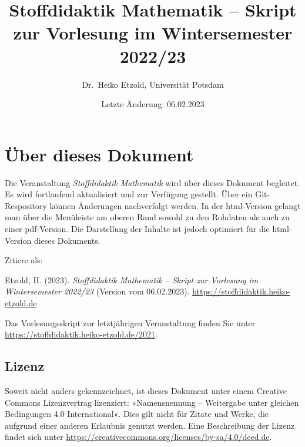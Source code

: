 \documentclass[
]{scrbook}
\title{Stoffdidaktik Mathematik -- Skript zur Vorlesung im Wintersemester 2022/23}
\author{Dr.~Heiko Etzold, Universität Potsdam}
\date{Letzte Änderung: 06.02.2023}
\makeatletter
\renewenvironment{quote}{
  \list{}{
	\leftmargin0.2cm   %
    \rightmargin\leftmargin
      	\def\FrameCommand
    {%
        {\color{quoteColor}\vrule width 2pt}%
        \hspace{0pt}%
    }%
    \MakeFramed{\advance \hsize -\width \FrameRestore}    \color{quoteColor}
    }
  \item\relax
}
{\endlist\color{black}\endMakeFramed}
\def\renewtheorem#1{%
  \expandafter\let\csname#1\endcsname\relax
  \expandafter\let\csname c@#1\endcsname\relax
  \gdef\renewtheorem@envname{#1}
  \renewtheorem@secpar
}
\def\renewtheorem@secpar{\@ifnextchar[{\renewtheorem@numberedlike}{\renewtheorem@nonumberedlike}}
\def\renewtheorem@numberedlike[#1]#2{\newtheorem{\renewtheorem@envname}[#1]{#2}}
\def\renewtheorem@nonumberedlike#1{
\def\renewtheorem@caption{#1}
\edef\renewtheorem@nowithin{\noexpand\newtheorem{\renewtheorem@envname}{\renewtheorem@caption}}
\renewtheorem@thirdpar
}
\def\renewtheorem@thirdpar{\@ifnextchar[{\renewtheorem@within}{\renewtheorem@nowithin}}
\def\renewtheorem@within[#1]{\renewtheorem@nowithin[#1]}
\theoremstyle{definition}
\theoremstyle{definition}
\theoremstyle{definition}
\theoremstyle{definition}
\theoremstyle{remark}
\makeatother
\begin{document}
\maketitle

%

{
\hypersetup{linkcolor=}
\setcounter{tocdepth}{1}
\tableofcontents
}
\hypertarget{uxfcber-dieses-dokument}{%
\chapter*{Über dieses Dokument}\label{uxfcber-dieses-dokument}}

Die Veranstaltung \emph{Stoffdidaktik Mathematik} wird über dieses Dokument begleitet. Es wird fortlaufend aktualisiert und zur Verfügung gestellt. Über ein Git-Respository können Änderungen nachverfolgt werden. In der html-Version gelangt man über die Menüleiste am oberen Rand sowohl zu den Rohdaten als auch zu einer pdf-Version. Die Darstellung der Inhalte ist jedoch optimiert für die html-Version dieses Dokuments.

Zitiere als:

\begin{quote}
Etzold, H. (2023). \emph{Stoffdidaktik Mathematik -- Skript zur Vorlesung im Wintersemester 2022/23} (Version vom 06.02.2023). \url{https://stoffdidaktik.heiko-etzold.de}
\end{quote}

Das Vorlesungsskript zur letztjährigen Veranstaltung finden Sie unter \url{https://stoffdidaktik.heiko-etzold.de/2021}.

\hypertarget{lizenz}{%
\section*{Lizenz}\label{lizenz}}

Soweit nicht anders gekennzeichnet, ist dieses Dokument unter einem Creative Commons Lizenzvertrag lizenziert: »Namensnennung -- Weitergabe unter gleichen Bedingungen 4.0 International«. Dies gilt nicht für Zitate und Werke, die aufgrund einer anderen Erlaubnis genutzt werden.
Eine Beschreibung der Lizenz findet sich unter \url{https://creativecommons.org/licenses/by-sa/4.0/deed.de}.
\end{document}
